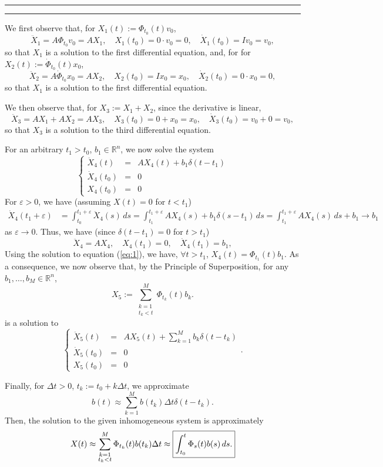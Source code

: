 \documentclass[11pt]{article}
\newcounter{questionCounter}
\newcounter{partCounter}[questionCounter]
\newenvironment{question}[2][\arabic{questionCounter}]{%
    \setcounter{partCounter}{0}%
    \vspace{.25in} \hrule \vspace{0.5em}%
        \noindent{\bf #2}%
    \vspace{0.8em} \hrule \vspace{.10in}%
    \addtocounter{questionCounter}{1}%
}{}
\newcommand{\R}{\mathbb{R}} %
\newcommand{\e}{\varepsilon} %
\begin{document}
\begin{question}{Problem 3}
We first observe that, for $X_1(t) := \Phi_{t_0}(t) v_0$,
\begin{equation}
\ddot X_1 = A \Phi_{t_0}v_0 = AX_1,   \quad
        X_1(t_0) = 0 \cdot v_0 = 0,     \quad
   \dot X_1(t_0) = I v_0 = v_0,
\label{eq:1}
\end{equation}
so that $X_1$ is a solution to the first differential equation, and, for
for $X_2(t) := \dot\Phi_{t_0}(t) x_0$,
\[\ddot X_2 = A \dot\Phi_{t_0}x_0 = AX_2,   \quad
        X_2(t_0) = I x_0 = x_0,     \quad
   \dot X_2(t_0) = 0 \cdot x_0 = 0,\]
so that $X_1$ is a solution to the first differential equation.

We then observe that, for $X_3 := X_1 + X_2$, since the derivative is linear,
\[\ddot X_3 = AX_1 + AX_2 = AX_3,       \quad
        X_3(t_0) = 0 + x_0 = x_0,       \quad
   \dot X_3(t_0) = v_0 + 0 = v_0,\]
so that $X_3$ is a solution to the third differential equation.

For an arbitrary $t_1 > t_0$, $b_1 \in \R^n$, we now solve the system
\[
\left\{
\begin{array}{rcl}
\ddot X_4(t)   & = & AX_4(t) + b_1\delta(t - t_1) \\
\dot  X_4(t_0) & = & 0                        \\
      X_4(t_0) & = & 0
\end{array}
\right.
\]
For $\e > 0$, we have (assuming $X(t) = 0$ for $t < t_1$)
\begin{align*}
\dot  X_4(t_1 + \e)
 & = \int_{t_0}^{t_1 + \e} \ddot X_4(s) \, ds
   = \int_{t_1}^{t_1 + \e} AX_4(s) + b_1\delta(s - t_1) \, ds
   = \int_{t_1}^{t_1 + \e} AX_4(s) \, ds + b_1 \rightarrow b_1
\end{align*}
as $\e \rightarrow 0$. Thus, we have (since $\delta(t - t_1) = 0$ for $t >
t_1$)
\[
\ddot X_4 = AX_4,   \quad
        X_4(t_1) = 0,     \quad
   \dot X_4(t_1) = b_1,
\]
Using the solution to equation (\ref{eq:1}), we have, $\forall t >
t_1$, $X_4(t) = \Phi_{t_1}(t)b_1$. As a consequence, we now observe that, by
the Principle of Superposition, for
any $b_1,\dots,b_M \in \R^n$,
\[X_5 := \sum_{\substack{k = 1 \\ t_k < t}}^M \Phi_{t_k}(t)b_k.\]
is a solution to
\[
\left\{
\begin{array}{rcl}
\ddot X_5(t)   & = & AX_5(t) + \sum_{k = 1}^M b_k\delta(t - t_k) \\
\dot  X_5(t_0) & = & 0                        \\
      X_5(t_0) & = & 0
\end{array}
\right..
\]

Finally, for $\Delta t > 0$, $t_k := t_0 + k\Delta t$, we approximate
\[b(t) \approx \sum_{k = 1}^{M} b(t_k) \Delta t \delta(t - t_k).\]
Then, the solution to the given inhomogeneous system is approximately
\[
 X(t)
 \approx \sum_{\substack{k = 1 \\ t_k < t}}^M \Phi_{t_k}(t)b(t_k)\Delta t
 \approx \mbox{\fbox{$\displaystyle \int_{t_0}^t \Phi_s(t) b(s) \, ds$.}}
\]
\end{question}
\end{document}
